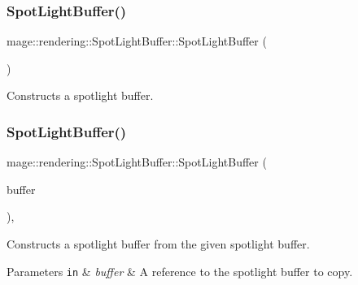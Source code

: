 \subsubsection{\texorpdfstring{Spot\+Light\+Buffer()}{SpotLightBuffer()}\hspace{0.1cm}{\footnotesize\ttfamily [1/3]}}
{\footnotesize\ttfamily mage\+::rendering\+::\+Spot\+Light\+Buffer\+::\+Spot\+Light\+Buffer (\begin{DoxyParamCaption}{ }\end{DoxyParamCaption})\hspace{0.3cm}{\ttfamily [noexcept]}}

Constructs a spotlight buffer. \hypertarget{structmage_1_1rendering_1_1_spot_light_buffer_a091924b026f081f1612138806ff1e107}{}\label{structmage_1_1rendering_1_1_spot_light_buffer_a091924b026f081f1612138806ff1e107} 
\subsubsection{\texorpdfstring{Spot\+Light\+Buffer()}{SpotLightBuffer()}\hspace{0.1cm}{\footnotesize\ttfamily [2/3]}}
{\footnotesize\ttfamily mage\+::rendering\+::\+Spot\+Light\+Buffer\+::\+Spot\+Light\+Buffer (\begin{DoxyParamCaption}\item[{const \hyperlink{structmage_1_1rendering_1_1_spot_light_buffer}{Spot\+Light\+Buffer} \&}]{buffer }\end{DoxyParamCaption})\hspace{0.3cm}{\ttfamily [default]}, {\ttfamily [noexcept]}}

Constructs a spotlight buffer from the given spotlight buffer.


\begin{DoxyParams}[1]{Parameters}
\mbox{\tt in}  & {\em buffer} & A reference to the spotlight buffer to copy. \\
\hline
\end{DoxyParams}
\hypertarget{structmage_1_1rendering_1_1_spot_light_buffer_a36fe774118a2b1d0e48ba89e74d09886}{}\label{structmage_1_1rendering_1_1_spot_light_buffer_a36fe774118a2b1d0e48ba89e74d09886} 
